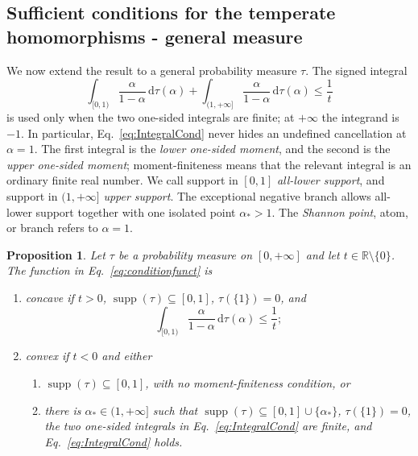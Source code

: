 \documentclass[aps,pra,11pt,onecolumn,nofootinbib,tightenlines]{revtex4-2}
\newtheorem{proposition}[theorem]{Proposition}
\theoremstyle{definition}
\def \d {\mathrm{d}}
\newcommand{\R}{\mathbb{R}}
\begin{document}
\subsection{Sufficient conditions for the temperate homomorphisms - general measure}

We now extend the result to a general probability measure $\tau$.  The signed
integral
\begin{equation}
\label{eq:IntegralCond}
\int_{[0,1)}\frac{\alpha}{1-\alpha}\,\d\tau(\alpha)
+\int_{(1,+\infty]}\frac{\alpha}{1-\alpha}\,\d\tau(\alpha)
\leq\frac1t
\end{equation}
is used only when the two one-sided integrals are finite; at $+\infty$ the
integrand is $-1$.  In particular, Eq.~\eqref{eq:IntegralCond} never hides an
undefined cancellation at $\alpha=1$.
The first integral is the \emph{lower one-sided moment}, and the second is the
\emph{upper one-sided moment}; moment-finiteness means that the relevant
integral is an ordinary finite real number.  We call support in $[0,1]$
\emph{all-lower support}, and support in $(1,+\infty]$ \emph{upper support}.
The exceptional negative branch allows all-lower support together with one
isolated point $\alpha_*>1$.  The \emph{Shannon point}, atom, or branch refers
to $\alpha=1$.

\begin{proposition}
\label{prop:sufficient-conditions}
Let $\tau$ be a probability measure on $[0,+\infty]$ and let
$t\in\R\setminus\{0\}$.  The function in Eq.~\eqref{eq:conditionfunct} is
\begin{enumerate}
\item concave if $t>0$,
$\operatorname{supp}(\tau)\subseteq[0,1]$, $\tau(\{1\})=0$, and
\begin{equation}
\int_{[0,1)}\frac{\alpha}{1-\alpha}\,\d\tau(\alpha)\leq\frac1t;
\end{equation}
\item convex if $t<0$ and either
  \begin{enumerate}[label=(\alph*)]
  \item $\operatorname{supp}(\tau)\subseteq[0,1]$, with no moment-finiteness
  condition, or
  \item there is $\alpha_*\in(1,+\infty]$ such that
  $\operatorname{supp}(\tau)\subseteq[0,1]\cup\{\alpha_*\}$,
  $\tau(\{1\})=0$, the two one-sided integrals in
  Eq.~\eqref{eq:IntegralCond} are finite, and Eq.~\eqref{eq:IntegralCond} holds.
  \end{enumerate}
\end{enumerate}
\end{proposition}
\end{document}
